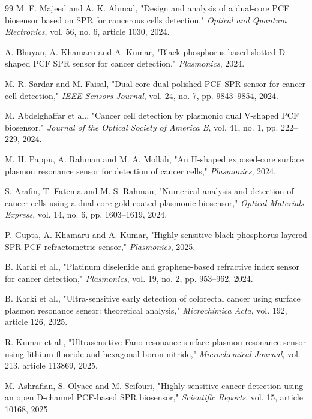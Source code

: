\documentclass[5p,times,twocolumn]{elsarticle}
\begin{document}
\begin{thebibliography}{99}
 M. F. Majeed and A. K. Ahmad, "Design and analysis of a dual-core PCF biosensor based on SPR for cancerous cells detection," \textit{Optical and Quantum Electronics}, vol. 56, no. 6, article 1030, 2024.

 A. Bhuyan, A. Khamaru and A. Kumar, "Black phosphorus-based slotted D-shaped PCF SPR sensor for cancer detection," \textit{Plasmonics}, 2024.

 M. R. Sardar and M. Faisal, "Dual-core dual-polished PCF-SPR sensor for cancer cell detection," \textit{IEEE Sensors Journal}, vol. 24, no. 7, pp. 9843--9854, 2024.

 M. Abdelghaffar et al., "Cancer cell detection by plasmonic dual V-shaped PCF biosensor," \textit{Journal of the Optical Society of America B}, vol. 41, no. 1, pp. 222--229, 2024.

 M. H. Pappu, A. Rahman and M. A. Mollah, "An H-shaped exposed-core surface plasmon resonance sensor for detection of cancer cells," \textit{Plasmonics}, 2024.

 S. Arafin, T. Fatema and M. S. Rahman, "Numerical analysis and detection of cancer cells using a dual-core gold-coated plasmonic biosensor," \textit{Optical Materials Express}, vol. 14, no. 6, pp. 1603--1619, 2024.

 P. Gupta, A. Khamaru and A. Kumar, "Highly sensitive black phosphorus-layered SPR-PCF refractometric sensor," \textit{Plasmonics}, 2025.

 B. Karki et al., "Platinum diselenide and graphene-based refractive index sensor for cancer detection," \textit{Plasmonics}, vol. 19, no. 2, pp. 953--962, 2024.

 B. Karki et al., "Ultra-sensitive early detection of colorectal cancer using surface plasmon resonance sensor: theoretical analysis," \textit{Microchimica Acta}, vol. 192, article 126, 2025.

 R. Kumar et al., "Ultrasensitive Fano resonance surface plasmon resonance sensor using lithium fluoride and hexagonal boron nitride," \textit{Microchemical Journal}, vol. 213, article 113869, 2025.

 M. Ashrafian, S. Olyaee and M. Seifouri, "Highly sensitive cancer detection using an open D-channel PCF-based SPR biosensor," \textit{Scientific Reports}, vol. 15, article 10168, 2025.


\end{thebibliography}
\end{document}
